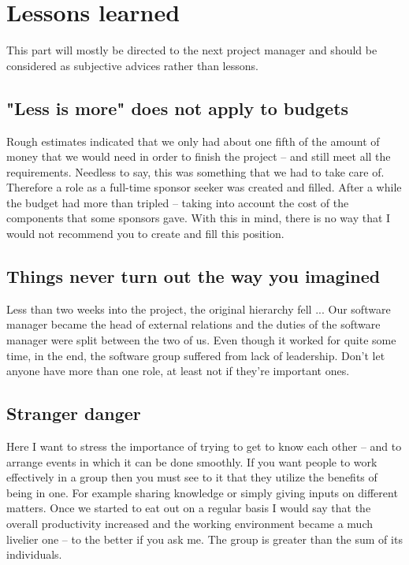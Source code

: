 
\section{Lessons learned}\label{sec:learnings}
This part will mostly be directed to the next project manager and should be considered as subjective advices rather than lessons.

\subsection{"Less is more" does not apply to budgets}
Rough estimates indicated that we only had about one fifth of the amount of money that we would need in order to finish the project -- and still meet all the requirements. Needless to say, this was something that we had to take care of. Therefore a role as a full-time sponsor seeker was created and filled. After a while the budget had more than tripled -- taking into account the cost of the components that some sponsors gave. With this in mind, there is no way that I would not recommend you to create and fill this position.
\subsection{Things never turn out the way you imagined}
Less than two weeks into the project, the original hierarchy fell ... Our software manager became the head of external relations and the duties of the software manager were split between the two of us. Even though it worked for quite some time, in the end, the software group suffered from lack of leadership. Don't let anyone have more than one role, at least not if they're important ones.
\subsection{Stranger danger}
Here I want to stress the importance of trying to get to know each other -- and to arrange events in which it can be done smoothly. If you want people to work effectively in a group then you must see to it that they utilize the benefits of being in one. For example sharing knowledge or simply giving inputs on different matters.
Once we started to eat out on a regular basis I would say that the overall productivity increased and the working environment became a much livelier one -- to the better if you ask me. The group is greater than the sum of its individuals.
